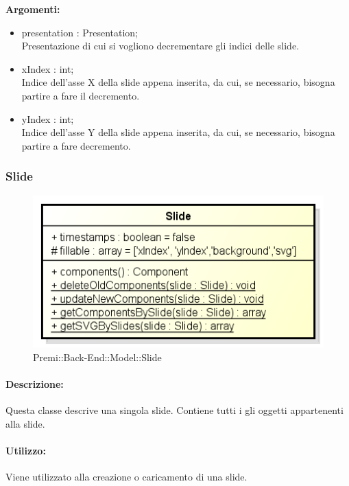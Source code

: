 \begin{itemize}
		\textbf{Argomenti:}
		\begin{itemize}
			\item presentation : Presentation;\\
			Presentazione di cui si vogliono decrementare gli indici delle \gls{slide}.
			\item xIndex : int;\\
			Indice dell'asse X della \gls{slide} appena inserita, da cui, se necessario, bisogna partire a fare il decremento.
			\item yIndex : int;\\
			Indice dell'asse Y della \gls{slide} appena inserita, da cui, se necessario, bisogna partire a fare decremento.
		\end{itemize}
	\end{itemize}
\newpage


\subsubsection{Slide}

	\begin{figure}[h]
		\centering
		\includegraphics[width=0.7\linewidth]{img/back_end_premi_model_slide}
		\caption[Premi::Back-End::Model::Slide]{Premi::Back-End::Model::Slide}
		\label{fig:back_end_premi_model_slide}
	\end{figure}


	\paragraph{Descrizione:}
	Questa classe descrive una singola \gls{slide}. Contiene tutti i gli oggetti appartenenti alla \gls{slide}.
	
	\paragraph{Utilizzo:}
	Viene utilizzato alla creazione o caricamento di una \gls{slide}.

